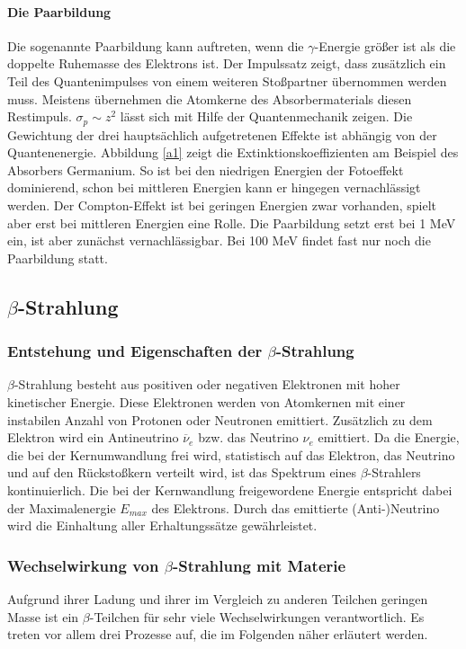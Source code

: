 \documentclass[11pt,ngerman,a4paper]{article}
\begin{document}
\paragraph{Die Paarbildung}
Die sogenannte Paarbildung kann auftreten, wenn die $\gamma$-Energie größer ist als die doppelte Ruhemasse des Elektrons ist.
Der Impulssatz zeigt, dass zusätzlich ein Teil des Quantenimpulses von einem weiteren Stoßpartner übernommen werden muss. Meistens übernehmen die Atomkerne des Absorbermaterials diesen Restimpuls. $\sigma_p \sim z^2$ lässt sich mit Hilfe der Quantenmechanik zeigen.
\newline\newline
Die Gewichtung der drei hauptsächlich aufgetretenen Effekte ist abhängig von der Quantenenergie. Abbildung \ref{a1} zeigt die Extinktionskoeffizienten am Beispiel des Absorbers Germanium. So ist bei den niedrigen Energien der Fotoeffekt dominierend, schon bei mittleren Energien kann er hingegen vernachlässigt werden. Der Compton-Effekt ist bei geringen Energien zwar vorhanden, spielt aber erst bei mittleren Energien eine Rolle. Die Paarbildung setzt erst bei 1 MeV ein, ist aber zunächst vernachlässigbar. Bei 100 MeV findet fast nur noch die Paarbildung statt.
\subsection{$\beta$-Strahlung}
\subsubsection{Entstehung und Eigenschaften der $\beta$-Strahlung}
$\beta$-Strahlung besteht aus positiven oder negativen Elektronen mit hoher kinetischer Energie. Diese Elektronen werden von Atomkernen mit einer instabilen Anzahl von Protonen oder Neutronen emittiert. Zusätzlich zu dem Elektron wird ein Antineutrino $\overline{\nu}_e$ bzw. das Neutrino $\nu_e$ emittiert. Da die Energie, die bei der Kernumwandlung frei wird, statistisch auf das Elektron, das Neutrino und auf den Rückstoßkern verteilt wird, ist das Spektrum eines $\beta$-Strahlers kontinuierlich. Die bei der Kernwandlung freigewordene Energie entspricht dabei der Maximalenergie $E_{max}$ des Elektrons. Durch das emittierte (Anti-)Neutrino wird die Einhaltung aller Erhaltungssätze gewährleistet.
\subsubsection{Wechselwirkung von $\beta$-Strahlung mit Materie}
Aufgrund ihrer Ladung und ihrer im Vergleich zu anderen Teilchen geringen Masse ist ein $\beta$-Teilchen für sehr viele Wechselwirkungen verantwortlich. Es treten vor allem drei Prozesse auf, die im Folgenden näher erläutert werden.
\end{document}
